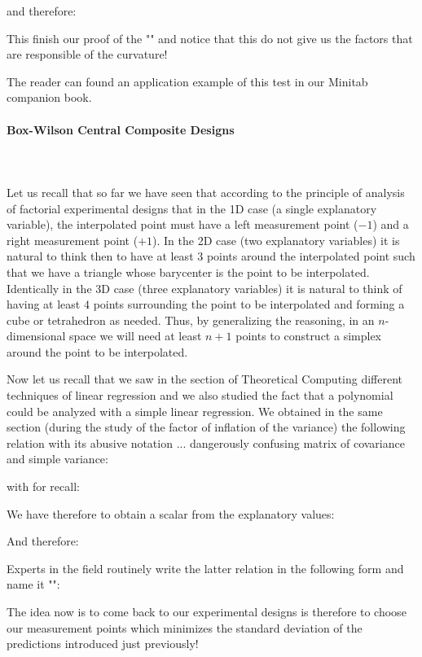 	and therefore:
	
	This finish our proof of the "" and notice that this do not give us the factors that are responsible of the curvature!
	
	The reader can found an application example of this test in our Minitab companion book.
	
	\pagebreak
	\paragraph{Box-Wilson Central Composite Designs}\mbox{}\\\\
	Let us recall that so far we have seen that according to the principle of analysis of factorial experimental designs that in the 1D case (a single explanatory variable), the interpolated point must have a left measurement point ($-1$) and a right measurement point ($+1$). In the 2D case (two explanatory variables) it is natural to think then to have at least $3$ points around the interpolated point  such that we have a triangle whose barycenter is the point to be interpolated. Identically in the 3D case (three explanatory variables) it is natural to think of having at least $4$ points surrounding the point to be interpolated and forming a cube or tetrahedron as needed. Thus, by generalizing the reasoning, in an $n$-dimensional space we will need at least $n + 1$ points to construct a simplex around the point to be interpolated.

	Now let us recall that we saw in the section of Theoretical Computing different techniques of linear regression and we also studied the fact that a polynomial could be analyzed with a simple linear regression. We obtained in the same section (during the study of the factor of inflation of the variance) the following relation with its abusive notation ... dangerously confusing matrix of covariance and simple variance:
	
	with for recall:
	
	We have therefore to obtain a scalar from the explanatory values:
	
 	And therefore:
	
	Experts in the field routinely write the latter relation in the following form and name it "":
	
	The idea now is to come back to our experimental designs is therefore to choose our measurement points which minimizes the standard deviation of the predictions introduced just previously!

